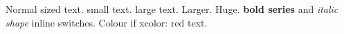 \documentclass{article}
\begin{document}
Normal sized text. {\small small text.} {\large large text.} {\Large Larger.} {\Huge Huge.}
{\bfseries bold series} and {\itshape italic shape} inline switches.
Colour if xcolor: {\color{red} red text}.
\end{document}

